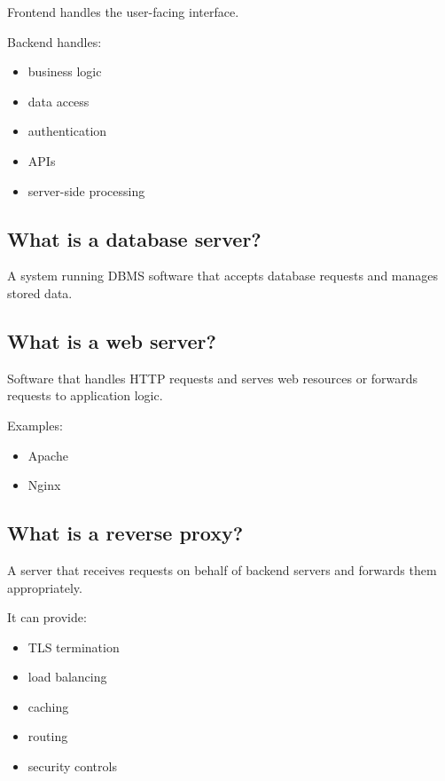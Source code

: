 Frontend handles the user-facing interface.

Backend handles:

\begin{itemize}
  \item business logic
  \item data access
  \item authentication
  \item APIs
  \item server-side processing
\end{itemize}

\medskip

\subsection{What is a database server?}

A system running DBMS software that accepts database requests and manages stored data.

\medskip

\subsection{What is a web server?}

Software that handles HTTP requests and serves web resources or forwards requests to application logic.

Examples:

\begin{itemize}
  \item Apache
  \item Nginx
\end{itemize}

\medskip

\subsection{What is a reverse proxy?}

A server that receives requests on behalf of backend servers and forwards them appropriately.

It can provide:

\begin{itemize}
  \item TLS termination
  \item load balancing
  \item caching
  \item routing
  \item security controls
\end{itemize}

